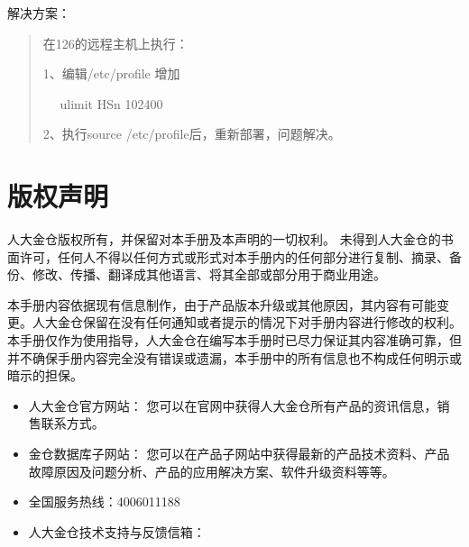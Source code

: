 \documentclass[a4,10pt,oneside,english]{sphinxmanual}
\begin{document}
解决方案：
\begin{quote}

在126的远程主机上执行：

1、编辑/etc/profile 增加

   ulimit \sphinxhyphen{}HSn 102400

2、执行source /etc/profile后，重新部署，问题解决。
\end{quote}

\appendix
{}\label{\detokenize{legalnotice::doc}}

\chapter{版权声明}
\label{\detokenize{legalnotice:id1}}
人大金仓版权所有，并保留对本手册及本声明的一切权利。
未得到人大金仓的书面许可，任何人不得以任何方式或形式对本手册内的任何部分进行复制、摘录、备份、修改、传播、翻译成其他语言、将其全部或部分用于商业用途。


本手册内容依据现有信息制作，由于产品版本升级或其他原因，其内容有可能变更。人大金仓保留在没有任何通知或者提示的情况下对手册内容进行修改的权利。
本手册仅作为使用指导，人大金仓在编写本手册时已尽力保证其内容准确可靠，但并不确保手册内容完全没有错误或遗漏，本手册中的所有信息也不构成任何明示或暗示的担保。

\begin{itemize}
\item {} 
人大金仓官方网站：
您可以在官网中获得人大金仓所有产品的资讯信息，销售联系方式。

\item {} 
金仓数据库子网站：
您可以在产品子网站中获得最新的产品技术资料、产品故障原因及问题分析、产品的应用解决方案、软件升级资料等等。

\item {} 
全国服务热线：400\sphinxhyphen{}601\sphinxhyphen{}1188

\item {} 
人大金仓技术支持与反馈信箱：

\end{itemize}



\renewcommand{\indexname}{Index}
\printindex
\end{document}
